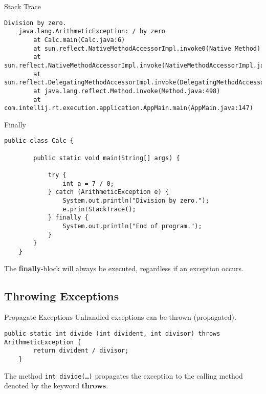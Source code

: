 \begin{frame}[fragile]{Stack Trace}
    \begin{lstlisting}[basicstyle=\ttfamily\scriptsize]
    Division by zero.
    java.lang.ArithmeticException: / by zero
        at Calc.main(Calc.java:6)
        at sun.reflect.NativeMethodAccessorImpl.invoke0(Native Method)
        at sun.reflect.NativeMethodAccessorImpl.invoke(NativeMethodAccessorImpl.java:62)
        at sun.reflect.DelegatingMethodAccessorImpl.invoke(DelegatingMethodAccessorImpl.java:43)
        at java.lang.reflect.Method.invoke(Method.java:498)
        at com.intellij.rt.execution.application.AppMain.main(AppMain.java:147)
    \end{lstlisting}
\end{frame}

\begin{frame}[fragile]{Finally}
    \begin{lstlisting}[basicstyle=\ttfamily\scriptsize]
    public class Calc {
    
        public static void main(String[] args) {
    
            try {
                int a = 7 / 0;
            } catch (ArithmeticException e) {
                System.out.println("Division by zero.");
                e.printStackTrace();
            } finally {
                System.out.println("End of program.");
            }
        }
    }
    \end{lstlisting}
    The \textbf{finally}-block will always be executed, regardless if an exception occurs.
\end{frame}

\subsection{Throwing Exceptions}
\begin{frame}[fragile]{Propagate Exceptions}
    Unhandled exceptions can be thrown (propagated).
    \begin{lstlisting}[basicstyle=\ttfamily\scriptsize]    
    public static int divide (int divident, int divisor) throws ArithmeticException {
        return divident / divisor;
    }
    \end{lstlisting}
    The method \texttt{int divide(\dots)} propagates the exception to the calling
    method denoted by the keyword \textbf{throws}.
\end{frame}

